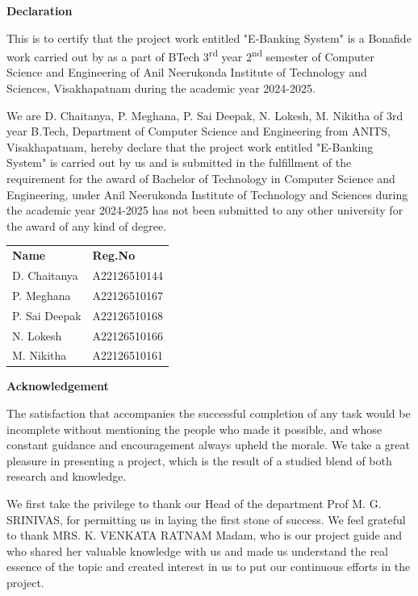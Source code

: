 \thispagestyle{empty}
\begin{center}
    {\huge\bfseries Declaration\par}
\end{center}
\vspace{1cm}

This is to certify that the project work entitled "E-Banking System" is a
Bonafide work carried out by as a part of BTech 3\textsuperscript{rd} year
2\textsuperscript{nd} semester of Computer Science and Engineering of Anil
Neerukonda Institute of Technology and Sciences, Visakhapatnam during the
academic year 2024-2025.

We are D. Chaitanya, P. Meghana, P. Sai Deepak, N. Lokesh, M. Nikitha of 3rd
year B.Tech, Department of Computer Science and Engineering from ANITS,
Visakhapatnam, hereby declare that the project work entitled "E-Banking System"
is carried out by us and is submitted in the fulfillment of the requirement for
the award of Bachelor of Technology in Computer Science and Engineering, under
Anil Neerukonda Institute of Technology and Sciences during the academic year
2024-2025 has not been submitted to any other university for the award of any
kind of degree.

\vspace{2cm}
\begin{tabular}{ll}
\textbf{Name} & \textbf{Reg.No} \\
D. Chaitanya & A22126510144 \\
P. Meghana & A22126510167 \\
P. Sai Deepak & A22126510168 \\
N. Lokesh & A22126510166 \\
M. Nikitha & A22126510161 \\
\end{tabular}
\newpage

\thispagestyle{empty}
\begin{center}
    {\huge\bfseries Acknowledgement\par}
\end{center}
\vspace{1cm}

The satisfaction that accompanies the successful completion of any task would
be incomplete without mentioning the people who made it possible, and whose
constant guidance and encouragement always upheld the morale. We take a great
pleasure in presenting a project, which is the result of a studied blend of
both research and knowledge.

We first take the privilege to thank our Head of the department Prof M.
G. SRINIVAS, for permitting us in laying the first stone of success. We
feel grateful to thank MRS. K. VENKATA RATNAM Madam, who is our project guide
and who shared her valuable knowledge with us and made us understand the real
essence of the topic and created interest in us to put our continuous efforts
in the project.

